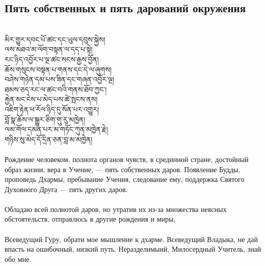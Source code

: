 \subsection*{Пять собственных и пять дарований окружения}
\\
\ti
མིར་གྱུར་དབང་པོ་ཚང་དང་ཡུལ་དབུས་སྐྱེས།\\
ལས་མཐའ་མ་ལོག་བསྟན་ལ་དད་པ་སྟེ།\\
རང་ཉིད་འབྱོར་པ་ལྔ་ཚང་སངས་རྒྱས་བྱོན། \\
ཆོས་གསུངས་བསྟན་པ་གནས་དང་དེ་ལ་ཞུགས།\\
བཤེས་གཉེན་དམ་པས་ཟིན་དང་གཞན་འབྱོར་ལྔ།\\
ཐམས་ཅད་རང་ལ་ཚང་བའི་གནས་ཐོབ་ཀྱང༌།\\
རྐྱེན་མང་ངེས་པ་མེད་པས་ཚེ་སྤངས་ནས།\\
འཇིག་རྟེན་ཕ་རོལ་ཉིད་དུ་སོན་པར་འགྱུར།\\
བློ་སྣ་ཆོས་ལ་སྒྱུར་ཅིག་གུ་རུ་མཁྱེན།\\
ལམ་གོལ་དམན་པར་མ་གཏོང་ཀུན་མཁྱེན་རྗེ།\\
གཉིས་སུ་མེད་དོ་དྲིན་ཅན་བླ་མ་མཁྱེན།\\
\\
\ru
Рождение человеком, полнота органов чувств, в срединной стране,
достойный образ жизни, вера в Учение, —
пять собствен\-ных даров. Появление Будды,
проповедь Дхармы, пребывание Учения, следование ему,
поддержка Святого Духовного Друга — пять других даров.\\
 \\
Обладаю всей полнотой даров, но
утратив их из-за множества неясных обстоятельств,
отправлюсь в другие рождения и миры,\\
\\
Всеведущий Гуру, обрати мое мышление к дхарме.
Всеведущий Владыка, не дай впасть на ошибочный, низкий путь.
Нераздели\-мыий, Милосердный Учитель, знай обо мне.

\newpage
